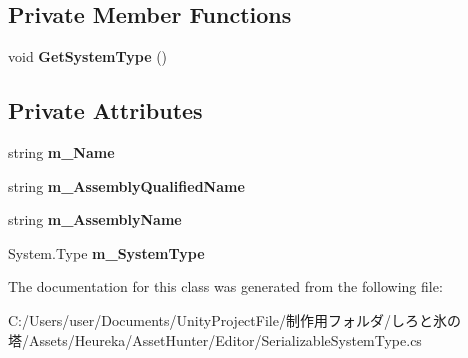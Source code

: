 \subsection*{Private Member Functions}
\begin{DoxyCompactItemize}
\item 
\mbox{\label{class_heureka_games_1_1_serializable_system_type_a7a581709ed12f0aab12ec40aeb57f37c}} 
void {\bfseries Get\+System\+Type} ()
\end{DoxyCompactItemize}
\subsection*{Private Attributes}
\begin{DoxyCompactItemize}
\item 
\mbox{\label{class_heureka_games_1_1_serializable_system_type_a5f601207b98d44d3a9a29f27e15b3e48}} 
string {\bfseries m\+\_\+\+Name}
\item 
\mbox{\label{class_heureka_games_1_1_serializable_system_type_aa89fa7e0d846ad40ca1f518ff6be8aa8}} 
string {\bfseries m\+\_\+\+Assembly\+Qualified\+Name}
\item 
\mbox{\label{class_heureka_games_1_1_serializable_system_type_aab9a24e9c4ffb22e15d263763121c218}} 
string {\bfseries m\+\_\+\+Assembly\+Name}
\item 
\mbox{\label{class_heureka_games_1_1_serializable_system_type_a9b3ad37629cf91bc5ce63f2fc8ecb420}} 
System.\+Type {\bfseries m\+\_\+\+System\+Type}
\end{DoxyCompactItemize}


The documentation for this class was generated from the following file\+:\begin{DoxyCompactItemize}
\item 
C\+:/\+Users/user/\+Documents/\+Unity\+Project\+File/制作用フォルダ/しろと氷の塔/\+Assets/\+Heureka/\+Asset\+Hunter/\+Editor/Serializable\+System\+Type.\+cs\end{DoxyCompactItemize}
